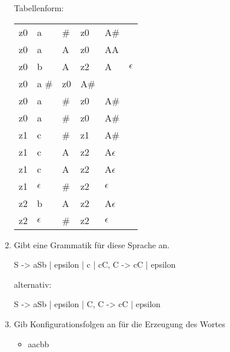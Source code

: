 \documentclass{lehramt-informatik-aufgabe}
\begin{document}
\begin{enumerate}
\begin{liAntwort}
\begin{center}
\end{center}

Tabellenform:

\begin{tabular}{llllll}
z0 & a & \# & z0 & A\#\\
z0 & a & A & z0 & AA\\
z0 & b & A & z2 & A & $\epsilon$\\
z0 & a \# & z0 & A\#\\
z0 & a & \# & z0 & A\#\\
z0 & a & \# & z0 & A\#\\

z1 & c & \# & z1 & A\#\\
z1 & c & A & z2 & A$\epsilon$\\
z1 & c & A & z2 & A$\epsilon$\\
z1 & $\epsilon$ & \# & z2 & $\epsilon$\\

z2 & b & A & z2 & A$\epsilon$\\
z2 & $\epsilon$ & \# & z2 & $\epsilon$\\
\end{tabular}
\end{liAntwort}

\item Gibt eine Grammatik für diese Sprache an.

\begin{liAntwort}
\begin{liProduktionsRegeln}
S -> aSb | epsilon | c | cC,
C -> cC | epsilon
\end{liProduktionsRegeln}

alternativ:

\begin{liProduktionsRegeln}
S -> aSb | epsilon | C,
C -> cC | epsilon
\end{liProduktionsRegeln}
\end{liAntwort}

\item Gib Konfigurationsfolgen an für die Erzeugung des Wortes

\begin{itemize}
\item aacbb


\end{itemize}
\end{enumerate}
\end{document}
